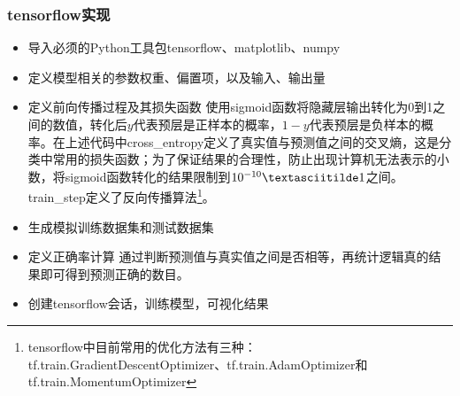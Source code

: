 \documentclass[a4paper,11pt]{ctexart}
\theoremstyle{break}
\theoremstyle{plain}
\begin{document}
\subsubsection{tensorflow实现}
\begin{itemize}
	\item 导入必须的Python工具包tensorflow、matplotlib、numpy
	\item 定义模型相关的参数权重、偏置项，以及输入、输出量
	\item 定义前向传播过程及其损失函数
	使用sigmoid函数将隐藏层输出转化为0到1之间的数值，转化后$y$代表预层是正样本的概率，$1-y$代表预层是负样本的概率。在上述代码中cross\_entropy定义了真实值与预测值之间的交叉熵，这是分类中常用的损失函数；为了保证结果的合理性，防止出现计算机无法表示的小数，将sigmoid函数转化的结果限制到$10^{-10}\textasciitilde 1$之间。train\_step定义了反向传播算法\footnote{tensorflow中目前常用的优化方法有三种：tf.train.GradientDescentOptimizer、tf.train.AdamOptimizer和tf.train.MomentumOptimizer}。
	\item 生成模拟训练数据集和测试数据集
	\item 定义正确率计算
	通过判断预测值与真实值之间是否相等，再统计逻辑真的结果即可得到预测正确的数目。
	\item 创建tensorflow会话，训练模型，可视化结果
\end{itemize}
\end{document}
